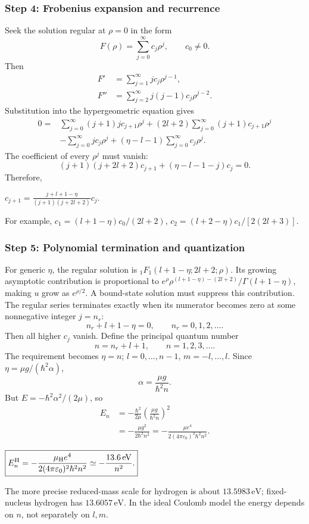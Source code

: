\documentclass[11pt,a4paper]{article}
\newcommand{\key}[1]{\begin{resultbox}\centering\(\displaystyle #1\)\end{resultbox}}
\newcommand{\mH}{\mu_{\mathrm H}}
\newcommand{\eps}{\varepsilon_0}
\begin{document}
\subsubsection*{Step 4: Frobenius expansion and recurrence}
Seek the solution regular at \(\rho=0\) in the form
\begin{equation}F(\rho)=\sum_{j=0}^\infty c_j\rho^j,\qquad c_0\ne0.\end{equation}
Then
\begin{align}
F'&=\sum_{j=1}^\infty jc_j\rho^{j-1},\\
F''&=\sum_{j=2}^\infty j(j-1)c_j\rho^{j-2}.
\end{align}
Substitution into the hypergeometric equation gives
\begin{align}
0={}&\sum_{j=0}^\infty(j+1)j c_{j+1}\rho^j+(2l+2)\sum_{j=0}^\infty(j+1)c_{j+1}\rho^j\\
&-\sum_{j=0}^\infty j c_j\rho^j+(\eta-l-1)\sum_{j=0}^\infty c_j\rho^j.
\end{align}
The coefficient of every \(\rho^j\) must vanish:
\begin{equation}(j+1)(j+2l+2)c_{j+1}+(\eta-l-1-j)c_j=0.\end{equation}
Therefore,
\key{\boxed{c_{j+1}=\frac{j+l+1-\eta}{(j+1)(j+2l+2)}c_j.}}
For example, \(c_1=(l+1-\eta)c_0/(2l+2)\), \(c_2=(l+2-\eta)c_1/[2(2l+3)]\).

\subsubsection*{Step 5: Polynomial termination and quantization}
For generic \(\eta\), the regular solution is \({}_1F_1(l+1-\eta;2l+2;\rho)\). Its growing asymptotic contribution is proportional to \(e^\rho\rho^{(l+1-\eta)-(2l+2)} /\Gamma(l+1-\eta)\), making \(u\) grow as \(e^{\rho/2}\). A bound-state solution must suppress this contribution. The regular series terminates exactly when its numerator becomes zero at some nonnegative integer \(j=n_r\):
\begin{equation}n_r+l+1-\eta=0,\qquad n_r=0,1,2,\ldots.\end{equation}
Then all higher \(c_j\) vanish. Define the principal quantum number
\begin{equation}\boxed{n=n_r+l+1,\qquad n=1,2,3,\ldots.}\end{equation}
The requirement becomes \(\eta=n\); \(l=0,\ldots,n-1\), \(m=-l,\ldots,l\). Since \(\eta=\mu g/(\hbar^2\alpha)\),
\begin{equation}\alpha=\frac{\mu g}{\hbar^2n}.\end{equation}
But \(E=-\hbar^2\alpha^2/(2\mu)\), so
\begin{align}
E_n&=-\frac{\hbar^2}{2\mu}\left(\frac{\mu g}{\hbar^2n}\right)^2\\
&=-\frac{\mu g^2}{2\hbar^2n^2}=-\frac{\mu e^4}{2(4\pi\eps)^2\hbar^2n^2}.
\end{align}
\key{\boxed{E_n^{\rm H}=-\frac{\mH e^4}{2(4\pi\eps)^2\hbar^2n^2}\simeq-\frac{13.6\,\mathrm{eV}}{n^2}.}}
The more precise reduced-mass scale for hydrogen is about \(13.5983\,\mathrm{eV}\); fixed-nucleus hydrogen has \(13.6057\,\mathrm{eV}\). In the ideal Coulomb model the energy depends on \(n\), not separately on \(l,m\).
\end{document}
